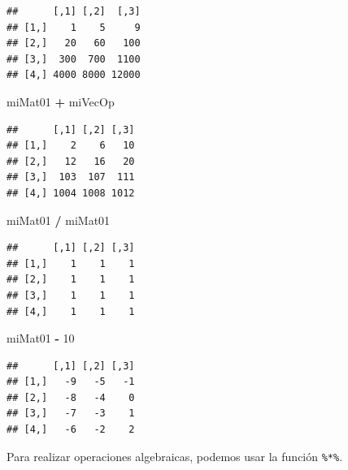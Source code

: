 \documentclass[]{book}
\newenvironment{Shaded}{\begin{snugshade}}{\end{snugshade}}
\newcommand{\KeywordTok}[1]{\textcolor[rgb]{0.13,0.29,0.53}{\textbf{#1}}}
\newcommand{\DecValTok}[1]{\textcolor[rgb]{0.00,0.00,0.81}{#1}}
\newcommand{\StringTok}[1]{\textcolor[rgb]{0.31,0.60,0.02}{#1}}
\newcommand{\CommentTok}[1]{\textcolor[rgb]{0.56,0.35,0.01}{\textit{#1}}}
\newcommand{\OperatorTok}[1]{\textcolor[rgb]{0.81,0.36,0.00}{\textbf{#1}}}
\newcommand{\NormalTok}[1]{#1}
\begin{document}
\begin{verbatim}
##      [,1] [,2]  [,3]
## [1,]    1    5     9
## [2,]   20   60   100
## [3,]  300  700  1100
## [4,] 4000 8000 12000
\end{verbatim}

\begin{Shaded}
\begin{Highlighting}[]
\NormalTok{miMat01 }\OperatorTok{+}\StringTok{ }\NormalTok{miVecOp}
\end{Highlighting}
\end{Shaded}

\begin{verbatim}
##      [,1] [,2] [,3]
## [1,]    2    6   10
## [2,]   12   16   20
## [3,]  103  107  111
## [4,] 1004 1008 1012
\end{verbatim}

\begin{Shaded}
\begin{Highlighting}[]
\NormalTok{miMat01 }\OperatorTok{/}\StringTok{ }\NormalTok{miMat01}
\end{Highlighting}
\end{Shaded}

\begin{verbatim}
##      [,1] [,2] [,3]
## [1,]    1    1    1
## [2,]    1    1    1
## [3,]    1    1    1
## [4,]    1    1    1
\end{verbatim}

\begin{Shaded}
\begin{Highlighting}[]
\NormalTok{miMat01 }\OperatorTok{-}\StringTok{ }\DecValTok{10}
\end{Highlighting}
\end{Shaded}

\begin{verbatim}
##      [,1] [,2] [,3]
## [1,]   -9   -5   -1
## [2,]   -8   -4    0
## [3,]   -7   -3    1
## [4,]   -6   -2    2
\end{verbatim}

Para realizar operaciones algebraicas, podemos usar la función
\texttt{\%*\%}.

\begin{Shaded}
\end{Shaded}
\end{document}
